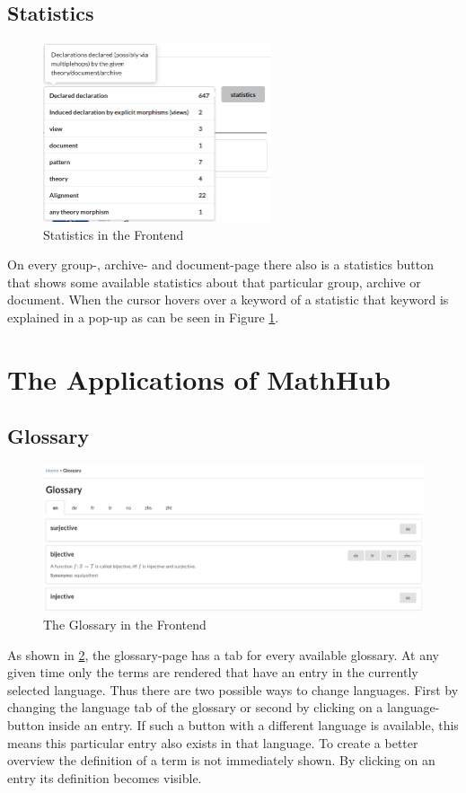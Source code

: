 \documentclass[11pt,a4paper]{article}
\begin{document}
\subsection{Statistics}
\begin{figure}[H]
\centerline{\includegraphics[width=0.6\textwidth]{statistics.png}}
\caption{Statistics in the Frontend}
\label{fig:stats}
\end{figure}
On every group-, archive- and document-page there also is a statistics button that shows some available statistics about that particular group, archive or document.
When the cursor hovers over a keyword of a statistic that keyword is explained in a pop-up as can be seen in Figure \ref{fig:stats}.

\section{The Applications of MathHub} \label{apps}
\subsection{Glossary} \label{gloss}
\begin{figure}[H]
\includegraphics[width=1\textwidth]{glossary.png}
\caption{The Glossary in the Frontend}
\label{fig:glossary}
\end{figure}
As shown in \ref{fig:glossary}, the glossary-page has a tab for every available glossary.
At any given time only the terms are rendered that have an entry in the currently selected language.
Thus there are two possible ways to change languages.
First by changing the language tab of the glossary or second by clicking on a language-button inside an entry.
If such a button with a different language is available, this means this particular entry also exists in that language.
\newline \newline
To create a better overview the definition of a term is not immediately shown.
By clicking on an entry its definition becomes visible.
\end{document}
